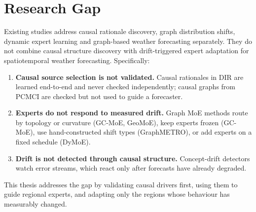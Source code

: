 \section{Research Gap}
\label{sec:lit-gap}

Existing studies address causal rationale discovery, graph distribution shifts, dynamic expert learning and graph-based weather forecasting separately. They do not combine causal structure discovery with drift-triggered expert adaptation for spatiotemporal weather forecasting. Specifically:
\begin{enumerate}[label=\textbf{G\arabic*.}]
  \item \textbf{Causal source selection is not validated.} Causal rationales in DIR are learned end-to-end and never checked independently; causal graphs from PCMCI are checked but not used to guide a forecaster.
  \item \textbf{Experts do not respond to measured drift.} Graph MoE methods route by topology or curvature (GC-MoE, GeoMoE), keep experts frozen (GC-MoE), use hand-constructed shift types (GraphMETRO), or add experts on a fixed schedule (DyMoE).
  \item \textbf{Drift is not detected through causal structure.} Concept-drift detectors watch error streams, which react only after forecasts have already degraded.
\end{enumerate}
This thesis addresses the gap by validating causal drivers first, using them to guide regional experts, and adapting only the regions whose behaviour has measurably changed.
